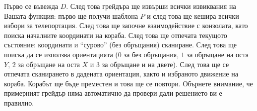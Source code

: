\documentclass[12pt]{article}
\begin{document}
Първо се въвежда $D$. След това грейдъра ще извърши всички извиквания на Вашата функция: първо ще получи шаблона $P$ и след това ще кешира всички избори за телепортация. След това ще започне взаимодействие с конзолата, като поиска началните координати на кораба. След това ще отпечата текущото състояние: координати и ``сурово'' (без обръщания) сканиране. След това ще поиска да се използва ориентацията ($0$ за без обръщания, $1$ за обръщане на оста $Y$, $2$ за обръщане на оста $X$ и $3$ за обръщане и на двете). След това ще се отпечата сканирането в дадената ориентация, както и избраното движение на кораба. Корабът ще бъде преместен и това ще се повтори. Обърнете внимание, че примерният грейдър няма автоматично да провери дали решението ви е правилно.
\end{document}

